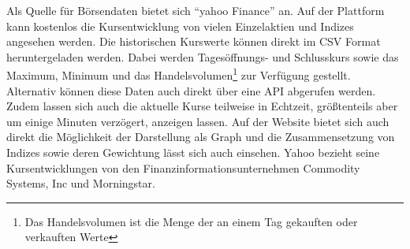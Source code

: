 Als Quelle für Börsendaten bietet sich \enquote{yahoo Finance} an. Auf der Plattform kann kostenlos die Kursentwicklung von vielen Einzelaktien und Indizes angesehen werden. Die historischen Kurswerte können direkt im \gls{CSV} Format heruntergeladen werden. Dabei werden Tagesöffnungs- und Schlusskurs sowie das Maximum, Minimum und das Handelsvolumen\footnote{Das Handelsvolumen ist die Menge der an einem Tag gekauften oder verkauften Werte} zur Verfügung gestellt. Alternativ können diese Daten auch direkt über eine \gls{API} abgerufen werden. Zudem lassen sich auch die aktuelle Kurse teilweise in Echtzeit, größtenteils aber um einige Minuten verzögert, anzeigen lassen. Auf der Website bietet sich auch direkt die Möglichkeit der Darstellung als Graph und die Zusammensetzung von Indizes sowie deren Gewichtung lässt sich auch einsehen. Yahoo bezieht seine Kursentwicklungen von den Finanzinformationsunternehmen Commodity Systems, Inc und Morningstar.

\clearpage